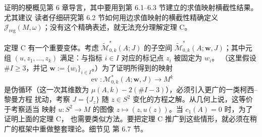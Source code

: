 证明的梗概见第 6 章导言，其中要用到第 6.1--6.3 节建立的求值映射横截性结果。尤其建议
读者仔细研究第 6.2 节如何用边求值映射的横截性精确定义
$\mathcal J_{\mathrm{reg}}(M,\omega)$；没有这个精确表述，就无法充分理解定理 C。

定理 C 有一个重要变体。考虑 $\widetilde{\mathcal M}^*_{0,k}(A;J)$ 的子空间
$\widetilde{\mathcal M}^*_{0,k}(A;\mathbf w,J)$；其中元组
$(u,z_1,\dots,z_k)$ 满足：与指标 $i\in I$ 对应的标记点 $z_i$ 被固定为 $w_i$。
（这里假设 $\#I\ge3$，并记 $\mathbf w:=\{w_i\}_{i\in I}$。）为了证明所得到的映射
\[
  \operatorname{ev}:\mathcal M^*_{0,k}(A;\mathbf w,J)\longrightarrow M^k
\]
是伪循环（这一次其维数为 $\mu(A,k)-2(\#I-3)$），必须引入更广的一类柯西--黎曼方程
扰动，考察 $J=\{J_z\}$ 随 $z\in S^2$ 变化的方程之解。从几何上说，这等价于考察适当
映射 $u:S^2\to M$ 的图像 $z\mapsto(z,u(z))$。当 $c_1(A)=0$ 时，为了证明上面的定理 C，
也需要类似方法。要把定理 C 推广到这些情形，就必须在稍广的框架中重做整套理论。细节见
第 6.7 节。
